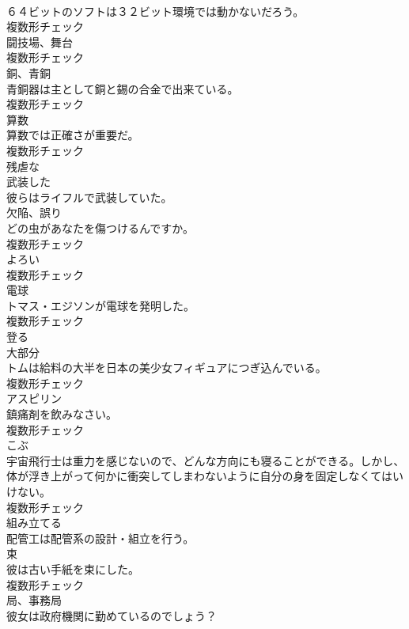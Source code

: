 \documentclass[8pt]{extreport}
\begin{document}
\begin{CJK}{UTF8}{min}
\\	６４ビットのソフトは３２ビット環境では動かないだろう。	
\\	複数形チェック
\\	[名詞]	闘技場、舞台	
\\	複数形チェック
\\	[名詞]	銅、⻘銅	
\\	青銅器は主として銅と錫の合金で出来ている。	
\\	複数形チェック
\\	[名詞]	算数	
\\	算数では正確さが重要だ。	
\\	複数形チェック
\\	[形容詞]	残虐な	
\\	[形容詞]	武装した	
\\	彼らはライフルで武装していた。	
\\	[名詞]	欠陥、誤り	
\\	どの虫があなたを傷つけるんですか。	
\\	複数形チェック
\\	[名詞]	よろい	
\\	複数形チェック
\\	[名詞]	電球	
\\	トマス・エジソンが電球を発明した。	
\\	複数形チェック
\\	[動詞]	登る	
\\	[名詞]	大部分	
\\	トムは給料の大半を日本の美少女フィギュアにつぎ込んでいる。	
\\	複数形チェック
\\	[名詞]	アスピリン	
\\	鎮痛剤を飲みなさい。	
\\	複数形チェック
\\	[名詞]	こぶ	
\\	宇宙飛行士は重力を感じないので、どんな方向にも寝ることができる。しかし、体が浮き上がって何かに衝突してしまわないように自分の身を固定しなくてはいけない。	
\\	複数形チェック
\\	[動詞]	組み立てる	
\\	配管工は配管系の設計・組立を行う。	
\\	[名詞]	束	
\\	彼は古い手紙を束にした。	
\\	複数形チェック
\\	[名詞]	局、事務局	
\\	彼女は政府機関に勤めているのでしょう？	

\end{CJK}
\end{document}
